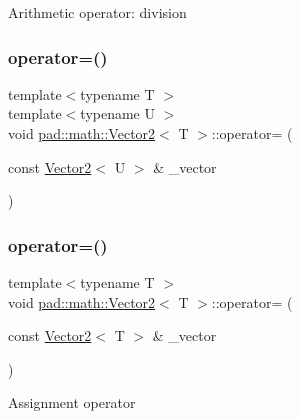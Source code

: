 Arithmetic operator\+: division \mbox{\label{structpad_1_1math_1_1_vector2_a15cc5eb00ac19e79734bc01e98da4595}} 
\subsubsection{\texorpdfstring{operator=()}{operator=()}\hspace{0.1cm}{\footnotesize\ttfamily [1/3]}}
{\footnotesize\ttfamily template$<$typename T $>$ \\
template$<$typename U $>$ \\
void \mbox{\hyperlink{structpad_1_1math_1_1_vector2}{pad\+::math\+::\+Vector2}}$<$ T $>$\+::operator= (\begin{DoxyParamCaption}\item[{const \mbox{\hyperlink{structpad_1_1math_1_1_vector2}{Vector2}}$<$ U $>$ \&}]{\+\_\+vector }\end{DoxyParamCaption})}

\mbox{\label{structpad_1_1math_1_1_vector2_aa51f745cce489dd9eac9291a1a9bc5c2}} 
\subsubsection{\texorpdfstring{operator=()}{operator=()}\hspace{0.1cm}{\footnotesize\ttfamily [2/3]}}
{\footnotesize\ttfamily template$<$typename T $>$ \\
void \mbox{\hyperlink{structpad_1_1math_1_1_vector2}{pad\+::math\+::\+Vector2}}$<$ T $>$\+::operator= (\begin{DoxyParamCaption}\item[{const \mbox{\hyperlink{structpad_1_1math_1_1_vector2}{Vector2}}$<$ T $>$ \&}]{\+\_\+vector }\end{DoxyParamCaption})}

Assignment operator \mbox{\label{structpad_1_1math_1_1_vector2_a33461284df3fb3b552f58aa3546da484}} 
